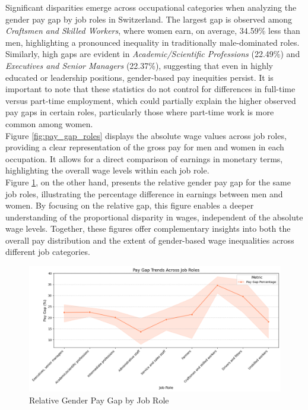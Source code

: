 \documentclass{article}
\begin{document}
Significant disparities emerge across occupational categories when analyzing the gender pay gap by job roles in Switzerland. The largest gap is observed among \textit{Craftsmen and Skilled Workers}, where women earn, on average, 34.59\% less than men, highlighting a pronounced inequality in traditionally male-dominated roles. Similarly, high gaps are evident in \textit{Academic/Scientific Professions} (22.49\%) and \textit{Executives and Senior Managers} (22.37\%), suggesting that even in highly educated or leadership positions, gender-based pay inequities persist. It is important to note that these statistics do not control for differences in full-time versus part-time employment, which could partially explain the higher observed pay gaps in certain roles, particularly those where part-time work is more common among women.\\


 Figure \ref{fig:pay_gap_roles} displays the absolute wage values across job roles, providing a clear representation of the gross pay for men and women in each occupation. It allows for a direct comparison of earnings in monetary terms, highlighting the overall wage levels within each job role.\\

Figure \ref{relative_gap_roles}, on the other hand, presents the relative gender pay gap for the same job roles, illustrating the percentage difference in earnings between men and women. By focusing on the relative gap, this figure enables a deeper understanding of the proportional disparity in wages, independent of the absolute wage levels. Together, these figures offer complementary insights into both the overall pay distribution and the extent of gender-based wage inequalities across different job categories.\\

\begin{figure}[h]
    \centering
    \includegraphics[width=1\textwidth]{Figures/Pay_Gap_Trends_by_Job_Role.png}
    \caption{Relative Gender Pay Gap by Job Role}
    \label{relative_gap_roles}
\end{figure}
\end{document}

